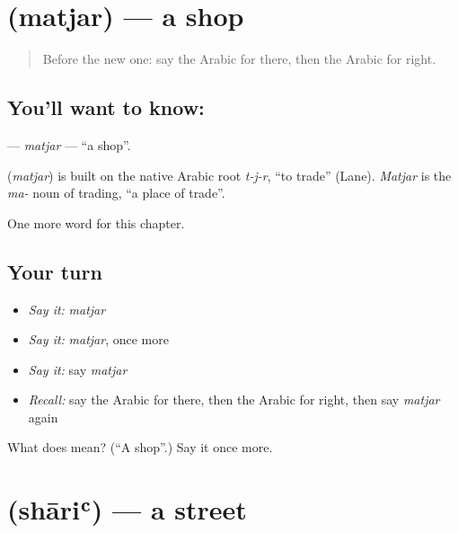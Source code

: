 \section[\texorpdfstring{\ar{متجر} (matjar)}{متجر (matjar)}]{ (matjar) — a shop}

\label{lesson:AR-C90-matjar}



\begin{quote}
Before the new one: say the Arabic for there, then the Arabic for right.
\end{quote}

\subsection*{You'll want to know: }
\textbf{} — \emph{matjar} — \textquotedblleft{}a shop\textquotedblright{}.

\begin{cousinweb}
\textbf{} (\emph{matjar}) is built on the native Arabic root \emph{t-j-r}, \textquotedblleft{}to trade\textquotedblright{} (Lane). \emph{Matjar} is the \emph{ma-} noun of trading, \textquotedblleft{}a place of trade\textquotedblright{}.
\end{cousinweb}

\begin{grammarlens}[title={What you've built}]
One more word for this chapter.
\end{grammarlens}

\subsection*{Your turn}
\begin{itemize}
\raggedright
  \item \emph{Say it:} \emph{matjar}
  \item \emph{Say it:} \emph{matjar}, once more
  \item \emph{Say it:} say \emph{matjar}
  \item \emph{Recall:} say the Arabic for there, then the Arabic for right, then say \emph{matjar} again
\end{itemize}

\begin{tcolorbox}[breakable,colback=teal!4,colframe=teal!35!black,title={Before you move on}]
What does  mean? (\textquotedblleft{}A shop\textquotedblright{}.) Say it once more.
\end{tcolorbox}
\section[\texorpdfstring{\ar{شارع} (shāriʿ)}{شارع (shāriʿ)}]{ (shāriʿ) — a street}

